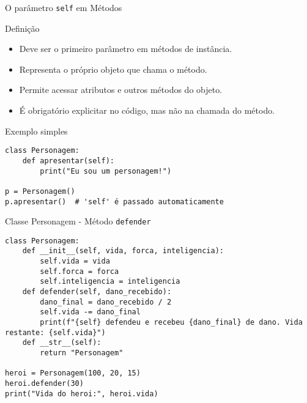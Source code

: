 \begin{frame}[fragile]{O parâmetro \texttt{self} em Métodos}

    \begin{block}{Definição}
        \begin{itemize}
            \item Deve ser o primeiro parâmetro em métodos de instância.
            \item Representa o próprio objeto que chama o método.
            \item Permite acessar atributos e outros métodos do objeto.
            \item É obrigatório explicitar no código, mas não na chamada do método.
        \end{itemize}
    \end{block}

    \begin{exampleblock}{Exemplo simples}
        \begin{verbatim}
class Personagem:
    def apresentar(self):
        print("Eu sou um personagem!")

p = Personagem()
p.apresentar()  # 'self' é passado automaticamente
\end{verbatim}
    \end{exampleblock}

\end{frame}
\begin{frame}[fragile]{Classe Personagem - Método \texttt{defender}}

    \begin{verbatim}
class Personagem:
    def __init__(self, vida, forca, inteligencia):
        self.vida = vida
        self.forca = forca
        self.inteligencia = inteligencia
    def defender(self, dano_recebido):
        dano_final = dano_recebido / 2
        self.vida -= dano_final
        print(f"{self} defendeu e recebeu {dano_final} de dano. Vida restante: {self.vida}")
    def __str__(self):
        return "Personagem"

heroi = Personagem(100, 20, 15)
heroi.defender(30)
print("Vida do heroi:", heroi.vida)
\end{verbatim}

\end{frame}

